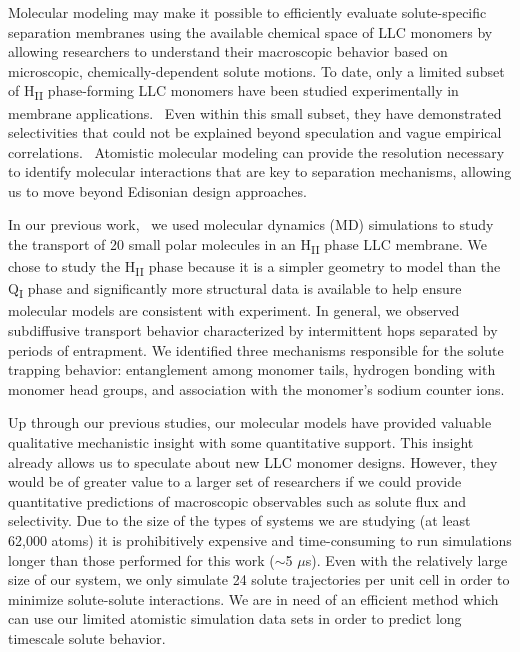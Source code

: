 \documentclass[journal=jctcce,manuscript=article]{achemso}
\begin{document}
  Molecular modeling may make it possible to efficiently evaluate solute-specific
  separation membranes using the available chemical space of LLC monomers by 
  allowing researchers to understand their macroscopic behavior based on 
  microscopic, chemically-dependent solute motions. To date, only a limited 
  subset of H\textsubscript{II} phase-forming LLC monomers have been studied
  experimentally in membrane applications.~\cite{carter_glycerol-based_2012,hatakeyama_nanoporous_2010,smith_ordered_1997,zhou_assembly_2003,resel_structural_2000}
  Even within this small subset, they have demonstrated selectivities that
  could not be explained beyond speculation and vague empirical
  correlations.~\cite{dischinger_application_2017} Atomistic molecular modeling
  can provide the resolution necessary to identify molecular interactions that
  are key to separation mechanisms, allowing us to move beyond Edisonian design
  approaches.

  In our previous work,~\cite{coscia_chemically_2019} we used molecular
  dynamics (MD) simulations to study the transport of 20 small polar molecules
  in an H\textsubscript{II} phase LLC membrane. We chose to study the
  H\textsubscript{II} phase because it is a simpler geometry to model than the
  Q\textsubscript{I} phase and significantly more structural data is available
  to help ensure molecular models are consistent with experiment. In general,
  we observed subdiffusive transport behavior characterized by intermittent
  hops separated by periods of entrapment. We identified three mechanisms
  responsible for the solute trapping behavior: entanglement among monomer
  tails, hydrogen bonding with monomer head groups, and association with the
  monomer's sodium counter ions.
  
  Up through our previous studies, our molecular models have provided valuable
  qualitative mechanistic insight with some quantitative support. This insight
  already allows us to speculate about new LLC monomer designs. However, they
  would be of greater value to a larger set of researchers if we could provide
  quantitative predictions of macroscopic observables such as solute flux and
  selectivity. Due to the size of the types of systems we are studying (at
  least 62,000 atoms) it is prohibitively expensive and time-consuming to run
  simulations longer than those performed for this work ($\sim$5 $\mu$s). Even
  with the relatively large size of our system, we only simulate 24 solute
  trajectories per unit cell in order to minimize solute-solute interactions.
  We are in need of an efficient method which can use our limited atomistic 
  simulation data sets in order to predict long timescale solute behavior.  
\end{document}
